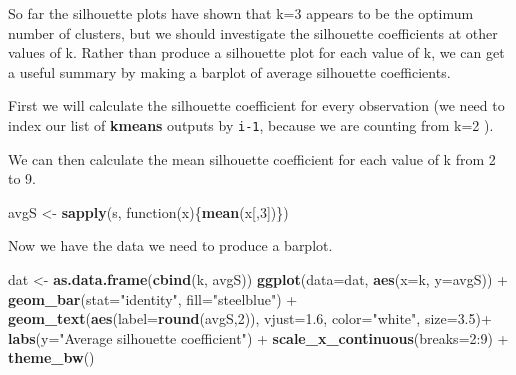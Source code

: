 \documentclass[]{book}
\newenvironment{Shaded}{\begin{snugshade}}{\end{snugshade}}
\newcommand{\KeywordTok}[1]{\textcolor[rgb]{0.13,0.29,0.53}{\textbf{{#1}}}}
\newcommand{\DataTypeTok}[1]{\textcolor[rgb]{0.13,0.29,0.53}{{#1}}}
\newcommand{\DecValTok}[1]{\textcolor[rgb]{0.00,0.00,0.81}{{#1}}}
\newcommand{\FloatTok}[1]{\textcolor[rgb]{0.00,0.00,0.81}{{#1}}}
\newcommand{\StringTok}[1]{\textcolor[rgb]{0.31,0.60,0.02}{{#1}}}
\newcommand{\NormalTok}[1]{{#1}}
\theoremstyle{definition}
\theoremstyle{definition}
\theoremstyle{definition}
\theoremstyle{remark}
\begin{document}
So far the silhouette plots have shown that k=3 appears to be the
optimum number of clusters, but we should investigate the silhouette
coefficients at other values of k. Rather than produce a silhouette plot
for each value of k, we can get a useful summary by making a barplot of
average silhouette coefficients.

First we will calculate the silhouette coefficient for every observation
(we need to index our list of \textbf{kmeans} outputs by \texttt{i-1},
because we are counting from k=2 ).

\begin{Shaded}
\end{Shaded}

We can then calculate the mean silhouette coefficient for each value of
k from 2 to 9.

\begin{Shaded}
\begin{Highlighting}[]
\NormalTok{avgS <-}\StringTok{ }\KeywordTok{sapply}\NormalTok{(s, function(x)\{}\KeywordTok{mean}\NormalTok{(x[,}\DecValTok{3}\NormalTok{])\})}
\end{Highlighting}
\end{Shaded}

Now we have the data we need to produce a barplot.

\begin{Shaded}
\begin{Highlighting}[]
\NormalTok{dat <-}\StringTok{ }\KeywordTok{as.data.frame}\NormalTok{(}\KeywordTok{cbind}\NormalTok{(k, avgS))}
\KeywordTok{ggplot}\NormalTok{(}\DataTypeTok{data=}\NormalTok{dat, }\KeywordTok{aes}\NormalTok{(}\DataTypeTok{x=}\NormalTok{k, }\DataTypeTok{y=}\NormalTok{avgS)) +}\StringTok{ }
\StringTok{         }\KeywordTok{geom_bar}\NormalTok{(}\DataTypeTok{stat=}\StringTok{"identity"}\NormalTok{, }\DataTypeTok{fill=}\StringTok{"steelblue"}\NormalTok{) +}
\StringTok{  }\KeywordTok{geom_text}\NormalTok{(}\KeywordTok{aes}\NormalTok{(}\DataTypeTok{label=}\KeywordTok{round}\NormalTok{(avgS,}\DecValTok{2}\NormalTok{)), }\DataTypeTok{vjust=}\FloatTok{1.6}\NormalTok{, }\DataTypeTok{color=}\StringTok{"white"}\NormalTok{, }\DataTypeTok{size=}\FloatTok{3.5}\NormalTok{)+}
\StringTok{  }\KeywordTok{labs}\NormalTok{(}\DataTypeTok{y=}\StringTok{"Average silhouette coefficient"}\NormalTok{) +}
\StringTok{  }\KeywordTok{scale_x_continuous}\NormalTok{(}\DataTypeTok{breaks=}\DecValTok{2}\NormalTok{:}\DecValTok{9}\NormalTok{) +}
\StringTok{  }\KeywordTok{theme_bw}\NormalTok{()}
\end{Highlighting}
\end{Shaded}
\end{document}
